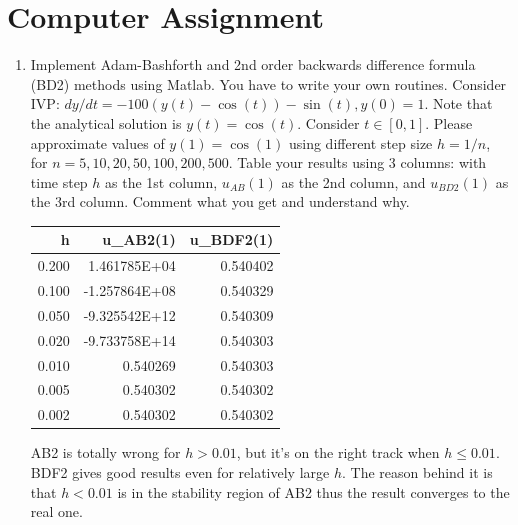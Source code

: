 \documentclass[10pt]{report}
\begin{document}
\section*{Computer Assignment}
\begin{enumerate}
	\item 
	Implement Adam-Bashforth and 2nd order backwards difference formula (BD2) methods using Matlab. You have to write your own routines. Consider IVP: $dy/dt = -100(y(t) - \cos(t)) - \sin(t), y(0) = 1$. Note that the analytical solution is $y(t) = \cos(t)$. Consider $t\in [0, 1]$. Please approximate values of $y(1) = \cos(1)$ using different step size $h = 1/n$, for $n = 5, 10, 20, 50, 100, 200, 500$. Table your results using 3 columns: with time step $h$ as the 1st column, $u_{AB}(1)$ as the 2nd column, and $u_{BD2}(1)$ as the 3rd column. Comment what you get and understand why.
	
	\begin{table}[H]
		\centering
		\begin{tabular}{*{3}{N}} 
			\toprule
			h & u_{AB2}(1) & u_{BDF2}(1) \\  & 1.461785E+04 & 0.540402\\
			0.100 & -1.257864E+08 & 0.540329\\
			0.050 & -9.325542E+12 & 0.540309\\
			0.020 & -9.733758E+14 & 0.540303\\
			0.010 & 0.540269 & 0.540303\\
			0.005 & 0.540302 & 0.540302\\
			0.002 & 0.540302 & 0.540302\\
			\bottomrule
		\end{tabular}
	\end{table}
	AB2 is totally wrong for $h>0.01$, but it's on the right track when $h\le 0.01$. BDF2 gives good results even for relatively large $h$. The reason behind it is that $h<0.01$ is in the stability region of AB2 thus the result converges to the real one.
	

\end{enumerate}
\end{document}
